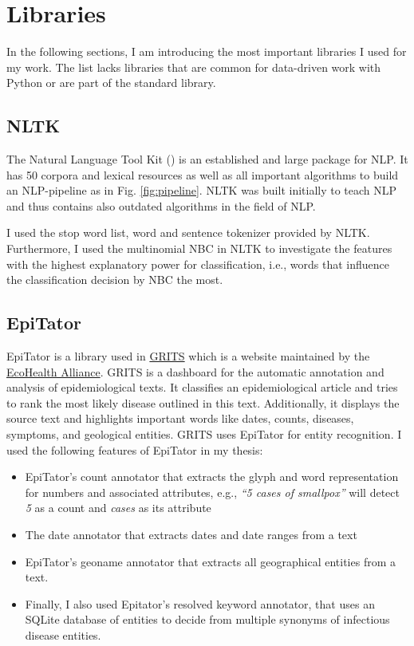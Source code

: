 \section{Libraries}
In the following sections, I am introducing the most important libraries I used for my work.
The list lacks libraries that are common for data-driven work with Python or are part of the standard library.
\subsection{NLTK}
The Natural Language Tool Kit () is an established and large package for NLP.
It has 50 corpora and lexical resources as well as all important algorithms to build an NLP-pipeline as in Fig. \ref{fig:pipeline}.
NLTK was built initially to teach NLP and thus contains also outdated algorithms in the field of NLP.

I used the stop word list, word and sentence tokenizer provided by NLTK.
Furthermore, I used the multinomial NBC in NLTK to investigate the features with the highest explanatory power for classification, i.e., words that influence the classification decision by NBC the most.

\subsection{EpiTator}
EpiTator is a library used in \href{https://grits.eha.io}{GRITS} which is a website maintained by the \href{https://www.ecohealthalliance.org}{EcoHealth Alliance}.
GRITS is a dashboard for the automatic annotation and analysis of epidemiological texts.
It classifies an epidemiological article and tries to rank the most likely disease outlined in this text.
Additionally, it displays the source text and highlights important words like dates, counts, diseases, symptoms, and geological entities.
GRITS uses EpiTator for entity recognition.
I used the following features of EpiTator in my thesis:
\begin{itemize}
  \item EpiTator's count annotator that extracts the glyph and word representation for numbers and associated attributes, e.g., \textit{``5 cases of smallpox''} will detect \textit{5} as a count and \textit{cases} as its attribute
  \item The date annotator that extracts dates and date ranges from a text
  \item EpiTator's geoname annotator that extracts all geographical entities from a text.
  \item  Finally, I also used Epitator's resolved keyword annotator, that uses an SQLite database of entities to decide from multiple synonyms of infectious disease entities.
\end{itemize}




